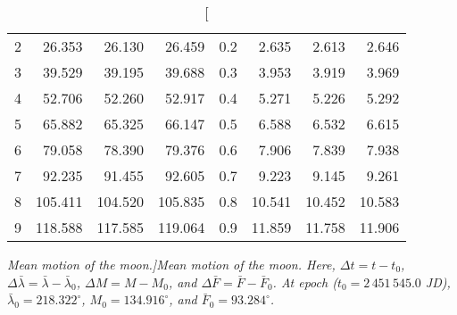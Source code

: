 \begin{table}
\begin{tabular}{rrrr|rrrr}
2 &  26.353 &  26.130 &  26.459 & 0.2 &   2.635 &   2.613 &   2.646\\
3 &  39.529 &  39.195 &  39.688 & 0.3 &   3.953 &   3.919 &   3.969\\
4 &  52.706 &  52.260 &  52.917 & 0.4 &   5.271 &   5.226 &   5.292\\
5 &  65.882 &  65.325 &  66.147 & 0.5 &   6.588 &   6.532 &   6.615\\
6 &  79.058 &  78.390 &  79.376 & 0.6 &   7.906 &   7.839 &   7.938\\
7 &  92.235 &  91.455 &  92.605 & 0.7 &   9.223 &   9.145 &   9.261\\
8 & 105.411 & 104.520 & 105.835 & 0.8 &  10.541 &  10.452 &  10.583\\
9 & 118.588 & 117.585 & 119.064 & 0.9 &  11.859 &  11.758 &  11.906\\
\end{tabular}
\caption[\em Mean motion of the moon.]{\em Mean motion of the moon.  Here, $\Delta t = t-t_0$, $\Delta\bar{\lambda} = \bar{\lambda}-\bar{\lambda}_0$, $\Delta M = M - M_0$, and $\Delta\bar{F}= \bar{F}-\bar{F}_0$. 
At epoch  ($t_0 = 2\,451\,545.0$ JD), $\bar{\lambda}_0 = 218.322^\circ$, $M_0 = 134.916^\circ$,
and $\bar{F}_0 = 93.284^\circ$.}\label{tmoonm}
\end{table}

